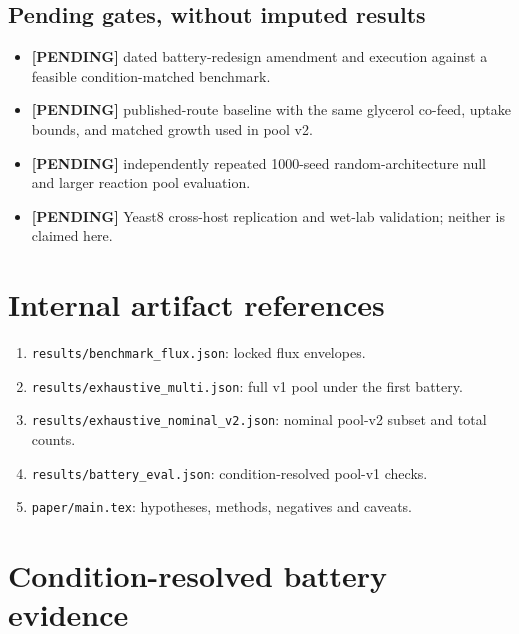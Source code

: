 \subsection{Pending gates, without imputed results}
\begin{itemize}\item \textbf{[PENDING]} dated battery-redesign amendment and execution against a feasible condition-matched benchmark.
\item \textbf{[PENDING]} published-route baseline with the same glycerol co-feed, uptake bounds, and matched growth used in pool v2.
\item \textbf{[PENDING]} independently repeated 1000-seed random-architecture null and larger reaction pool evaluation.
\item \textbf{[PENDING]} Yeast8 cross-host replication and wet-lab validation; neither is claimed here.
\end{itemize}
\section{Internal artifact references}
\begin{enumerate}\item \texttt{results/benchmark\_flux.json}: locked flux envelopes.\item \texttt{results/exhaustive\_multi.json}: full v1 pool under the first battery.\item \texttt{results/exhaustive\_nominal\_v2.json}: nominal pool-v2 subset and total counts.\item \texttt{results/battery\_eval.json}: condition-resolved pool-v1 checks.\item \texttt{paper/main.tex}: hypotheses, methods, negatives and caveats.\end{enumerate}

\section{Condition-resolved battery evidence}
